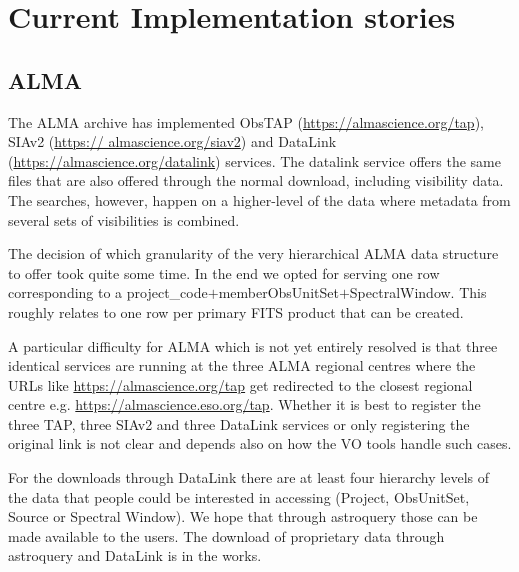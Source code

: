 \documentclass[11pt,a4paper]{ivoa}
\begin{document}
%



\appendix
\section{ Current Implementation stories}

\subsection{ALMA}
\label{sec:ALMA}
The ALMA archive has implemented ObsTAP (\url{https://almascience.org/tap}), SIAv2 (\url{https://
almascience.org/siav2}) and DataLink (\url{https://almascience.org/datalink}) services.
The datalink service offers the same files that are also offered through the normal download, including 
visibility data. The searches, however, happen on a higher-level of the data where metadata from several 
sets of visibilities is combined.

The decision of which granularity of the very hierarchical ALMA data
structure to offer took quite some time. In the end we opted for serving
one row corresponding to a project\_code$+$memberObsUnitSet$+$SpectralWindow. This roughly relates to 
one row per primary FITS product that can be created.

A particular difficulty for ALMA which is not yet entirely resolved is that three identical services are 
running at the three ALMA regional centres where the URLs like \url{https://almascience.org/tap} get 
redirected
to the closest regional centre e.g. \url{https://almascience.eso.org/tap}.
Whether it is best to register the three TAP, three SIAv2 and three DataLink services or only 
registering the original link is not clear and depends also on how the VO tools handle such cases.

For the downloads through DataLink there are at least four hierarchy
levels of the data that people could be interested in accessing (Project, ObsUnitSet, Source or Spectral
Window). We hope that through astroquery those can be made available to the users. The download of
proprietary data through astroquery and DataLink is in the works.
\end{document}
